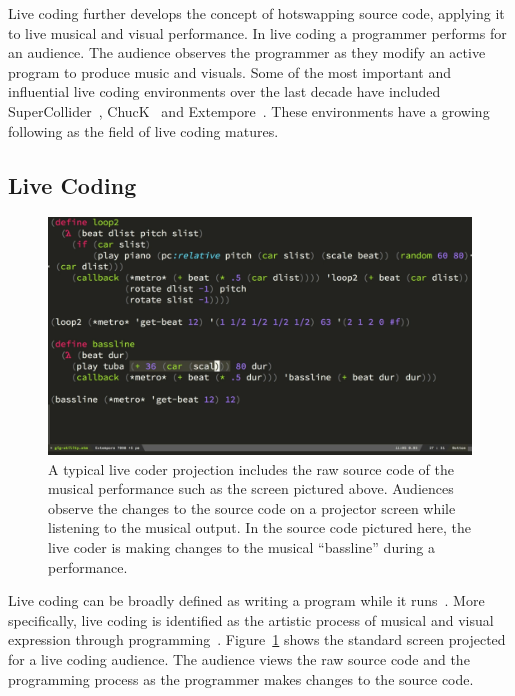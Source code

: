 Live coding further develops the concept of hotswapping source code, applying it to live musical and visual performance. In live coding a programmer performs for an audience. The audience observes the programmer as they modify an active program to produce music and visuals. Some of the most important and influential live coding environments over the last decade have included SuperCollider~\cite{McCartney}, ChucK~\cite{Wang2008} and Extempore~\cite{Sorensen}. These environments have a growing following as the field of live coding matures.

\subsection{Live Coding}

\begin{figure}
\centering
\includegraphics[width=1.0\textwidth]{../images/code/live-coding-screen.png}
\caption[A typical live coder projection]{A typical live coder projection includes the raw source code of the musical performance such as the screen pictured above. Audiences observe the changes to the source code on a projector screen while listening to the musical output. In the source code pictured here, the live coder is making changes to the musical ``bassline'' during a performance.}
\label{fig:live-coding-screen}
\end{figure}


Live coding can be broadly defined as writing a program while it runs~\cite{Ward2004}. More specifically, live coding is identified as the artistic process of musical and visual expression through programming~\cite{Collins2003}. Figure~\ref{fig:live-coding-screen} shows the standard screen projected for a live coding audience. The audience views the raw source code and the programming process as the programmer makes changes to the source code.

